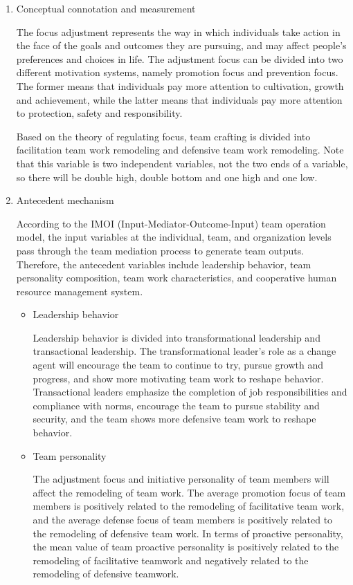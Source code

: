 \documentclass{mcmthesis}
\begin{document}
	\begin{enumerate}
		\item Conceptual connotation and measurement
		
		\qquad The focus adjustment represents the way in which individuals take action in the face of the goals and outcomes they are pursuing, and may affect people's preferences and choices in life.  The adjustment focus can be divided into two different motivation systems, namely promotion focus and prevention focus.  The former means that individuals pay more attention to cultivation, growth and achievement, while the latter means that individuals pay more attention to protection, safety and responsibility.

		\qquad Based on the theory of regulating focus, team crafting is divided into facilitation team work remodeling and defensive team work remodeling.  Note that this variable is two independent variables, not the two ends of a variable, so there will be double high, double bottom and one high and one low.

		\item Antecedent mechanism
		
		\qquad According to the IMOI (Input-Mediator-Outcome-Input) team operation model, the input variables at the individual, team, and organization levels pass through the team mediation process to generate team outputs.  Therefore, the antecedent variables include leadership behavior, team personality composition, team work characteristics, and cooperative human resource management system.

		\begin{itemize}
		\item Leadership behavior
		
		\qquad Leadership behavior is divided into transformational leadership and transactional leadership.  The transformational leader's role as a change agent will encourage the team to continue to try, pursue growth and progress, and show more motivating team work to reshape behavior.  Transactional leaders emphasize the completion of job responsibilities and compliance with norms, encourage the team to pursue stability and security, and the team shows more defensive team work to reshape behavior.

		\item Team personality
		
		\qquad The adjustment focus and initiative personality of team members will affect the remodeling of team work.  The average promotion focus of team members is positively related to the remodeling of facilitative team work, and the average defense focus of team members is positively related to the remodeling of defensive team work.  In terms of proactive personality, the mean value of team proactive personality is positively related to the remodeling of facilitative teamwork and negatively related to the remodeling of defensive teamwork.


\end{itemize}
\end{enumerate}
\end{document}
